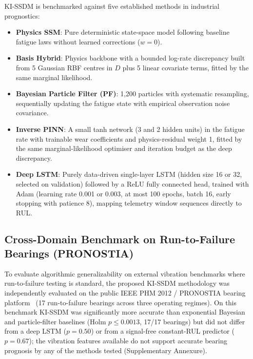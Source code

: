 \documentclass[a4paper,fleqn]{cas-dc}
\begin{document}
KI-SSDM is benchmarked against five established methods in industrial prognostics:
\begin{itemize}[leftmargin=1.5em]
    \item \textbf{Physics SSM}: Pure deterministic state-space model following baseline fatigue laws without learned corrections ($w = 0$).
    \item \textbf{Basis Hybrid}: Physics backbone with a bounded log-rate discrepancy built from 5 Gaussian RBF centres in $D$ plus 5 linear covariate terms, fitted by the same marginal likelihood.
    \item \textbf{Bayesian Particle Filter (PF)}: 1,200 particles with systematic resampling, sequentially updating the fatigue state with empirical observation noise covariance.
    \item \textbf{Inverse PINN}: A small tanh network (3 and 2 hidden units) in the fatigue rate with trainable wear coefficients and physics-residual weight 1, fitted by the same marginal-likelihood optimiser and iteration budget as the deep discrepancy.
    \item \textbf{Deep LSTM}: Purely data-driven single-layer LSTM (hidden size 16 or 32, selected on validation) followed by a ReLU fully connected head, trained with Adam (learning rate 0.001 or 0.003, at most 100 epochs, batch 16, early stopping with patience 8), mapping telemetry window sequences directly to RUL.
\end{itemize}

\subsection{Cross-Domain Benchmark on Run-to-Failure Bearings (PRONOSTIA)}
\label{subsec:pronostia_benchmark_setup}

To evaluate algorithmic generalizability on external vibration benchmarks where run-to-failure testing is standard, the proposed KI-SSDM methodology was independently evaluated on the public IEEE PHM 2012 / PRONOSTIA bearing platform~\cite{Lei_2018} (17 run-to-failure bearings across three operating regimes). On this benchmark KI-SSDM was significantly more accurate than exponential Bayesian and particle-filter baselines (Holm $p \le 0.0013$, 17/17 bearings) but did not differ from a deep LSTM ($p = 0.50$) or from a signal-free constant-RUL predictor ($p = 0.67$); the vibration features available do not support accurate bearing prognosis by any of the methods tested (Supplementary Annexure).
\end{document}
